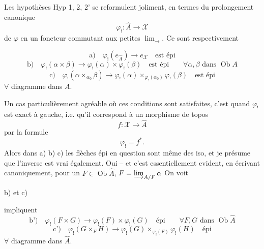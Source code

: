 Les hypothèses Hyp 1, 2, 2' se reformulent joliment, en termes du prolongement canonique
\[\varphi_!:\widehat A\longrightarrow\mathcal X\]
de $\varphi$ en un foncteur  commutant  aux petites $\lim_{\longrightarrow}$. Ce sont respectivement


\[
\text{a)}\quad \varphi_!(e_{\widehat A})\longrightarrow e_{\mathcal X}\quad\text{est épi}
\]
\[
\text{b)}\quad \varphi_!(\alpha\times\beta)\longrightarrow
\varphi_!(\alpha)\times\varphi_!(\beta)\quad\text{est épi}
\qquad \forall\alpha,\beta\text{ dans }\operatorname{Ob}A
\]
\[
\text{c)}\quad \varphi_!(\alpha\times_{\alpha_0}\beta)\longrightarrow
\varphi_!(\alpha)\times_{\varphi_!(\alpha_0)}\varphi_!(\beta)\quad\text{est épi}
\]
$\forall$ diagramme
dans $A$.

Un cas particulièrement agréable où ces conditions sont satisfaites, c'est quand $\varphi_!$ est exact à gauche, i.e. qu'il correspond  à un morphisme de topos
\[
f:\mathcal X\longrightarrow\widehat A
\]
par la formule
\[
\varphi_!=f^*.
\]
Alors dans a) b) c) les flèches épi en question sont même des iso, et je présume que l'inverse est vrai également. Oui -- et c'est essentiellement evident, en écrivant canoniquement, pour un $F\in\operatorname{Ob}\widehat A$, $F=\varinjlim_{A/F}\alpha$ \unsure{$\ldots$} On voit

 b) et c)



impliquent
\[
\text{b')}\quad\varphi_!(F\times G)\longrightarrow\varphi_!(F)\times\varphi_!(G)\quad\text{épi}
\qquad\forall F,G\text{ dans }\operatorname{Ob}\widehat A
\]
\[
\text{c')}\quad\varphi_!(G\times_F H)\longrightarrow
\varphi_!(G)\times_{\varphi_!(F)}\varphi_!(H)\quad\text{épi}
\]
$\forall$ diagramme
dans $\widehat A$.

